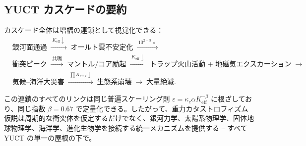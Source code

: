 \documentclass[12pt,a4paper]{article}
\begin{document}
	\subsection{YUCT カスケードの要約}
	カスケード全体は増幅の連鎖として視覚化できる：
	{\small
		\[
		\begin{aligned}
			&\text{銀河面通過}
			\;\xrightarrow{\;K_{\mathrm{eff}}\downarrow\;}\;
			\text{オールト雲不安定化}
			\;\xrightarrow{\;10^{2-3}\times\;}\\
			&\text{衝突ピーク}
			\;\xrightarrow{\;\text{共鳴}\;}\;
			\text{マントル/コア励起}
			\;\xrightarrow{\;K_{\mathrm{eff}}\downarrow\;}\;
			\text{トラップ火山活動 + 地磁気エクスカーション}
			\;\xrightarrow{\;}\\
			&\text{気候–海洋大災害}
			\;\xrightarrow{\;\prod K_{\mathrm{eff},i}\downarrow\;}\;
			\text{生態系崩壊}
			\;\xrightarrow{\;}\;
			\text{大量絶滅}.
		\end{aligned}
		\]
	}
	
	この連鎖のすべてのリンクは同じ普遍スケーリング則 \(\varepsilon = \kappa_c \alpha K_{\mathrm{eff}}^{-\beta}\) に根ざしており、同じ指数 \(\beta = 0.67\) で定量化できる。したがって、重力カタストロフィズム仮説は周期的な衝突体を仮定するだけでなく、銀河力学、太陽系物理学、固体地球物理学、海洋学、進化生物学を接続する統一メカニズムを提供する – すべて YUCT の単一の屋根の下で。
	
\end{document}
